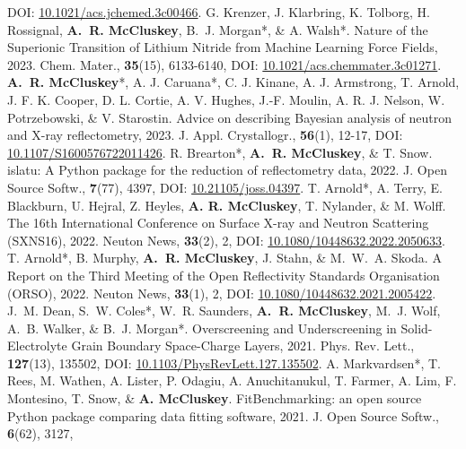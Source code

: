\begin{benumerate}{23}
    {DOI: \href{https://doi.org/10.1021/acs.jchemed.3c00466}{10.1021/acs.jchemed.3c00466}.}
  \cvpuby
    {G. Krenzer, J. Klarbring, K. Tolborg, H. Rossignal, \textbf{A.~R. McCluskey}, B.~J. Morgan*, \& A. Walsh*.}
    {Nature of the Superionic Transition of Lithium Nitride from Machine Learning Force Fields,}
    {2023.}
    {Chem. Mater.,}
    {\textbf{35}(15), 6133-6140,}
    {DOI: \href{https://doi.org/10.1021/acs.chemmater.3c01271}{10.1021/acs.chemmater.3c01271}.}
  \cvpuby
    {\textbf{A.~R. McCluskey}*, A. J. Caruana*, C. J. Kinane, A. J. Armstrong, T. Arnold, J. F. K. Cooper, D. L. Cortie, A. V. Hughes, J.-F. Moulin, A. R. J. Nelson, W. Potrzebowski, \& V. Starostin.}
    {Advice on describing Bayesian analysis of neutron and X-ray reflectometry,}
    {2023.}
    {J. Appl. Crystallogr.,}
    {\textbf{56}(1), 12-17,}
    {DOI: \href{https://doi.org/10.1107/S1600576722011426}{10.1107/S1600576722011426}.}
  \cvpuby
    {R. Brearton*, \textbf{A.~R. McCluskey}, \& T. Snow.}
    {islatu: A Python package for the reduction of reflectometry data,}
    {2022.}
    {J. Open Source Softw.,}
    {\textbf{7}(77), 4397,}
    {DOI: \href{https://doi.org/10.21105/joss.04397}{10.21105/joss.04397}.}
  \cvpuby
    {T. Arnold*, A. Terry, E. Blackburn, U. Hejral, Z. Heyles, \textbf{A. R. McCluskey}, T. Nylander, \& M. Wolff.}
    {The 16th International Conference on Surface X-ray and Neutron Scattering (SXNS16),}
    {2022.}
    {Neuton News,}
    {\textbf{33}(2), 2,}
    {DOI: \href{https://doi.org/10.1080/10448632.2022.2050633}{10.1080/10448632.2022.2050633}.}
  \cvpuby
    {T. Arnold*, B. Murphy, \textbf{A.~R. McCluskey}, J. Stahn, \& M.~W.~A. Skoda.}
    {A Report on the Third Meeting of the Open Reflectivity Standards Organisation (ORSO),}
    {2022.}
    {Neuton News,}
    {\textbf{33}(1), 2,}
    {DOI: \href{https://doi.org/10.1080/10448632.2021.2005422}{10.1080/10448632.2021.2005422}.}
  \cvpuby
    {J.~M. Dean, S.~W. Coles*, W.~R. Saunders, \textbf{A.~R. McCluskey}, M.~J. Wolf, A.~B. Walker, \& B.~J. Morgan*.}
    {Overscreening and Underscreening in Solid-Electrolyte Grain Boundary Space-Charge Layers,}
    {2021.}
    {Phys. Rev. Lett.,}
    {\textbf{127}(13), 135502,}
    {DOI: \href{https://doi.org/10.1103/PhysRevLett.127.135502}{10.1103/PhysRevLett.127.135502}.}
  \cvpuby
    {A. Markvardsen*, T. Rees, M. Wathen, A. Lister, P. Odagiu, A. Anuchitanukul, T. Farmer, A. Lim, F. Montesino, T. Snow, \& \textbf{A. McCluskey}.}
    {FitBenchmarking: an open source Python package comparing data fitting software,}
    {2021.}
    {J. Open Source Softw.,}
    {\textbf{6}(62), 3127,}

\end{benumerate}
